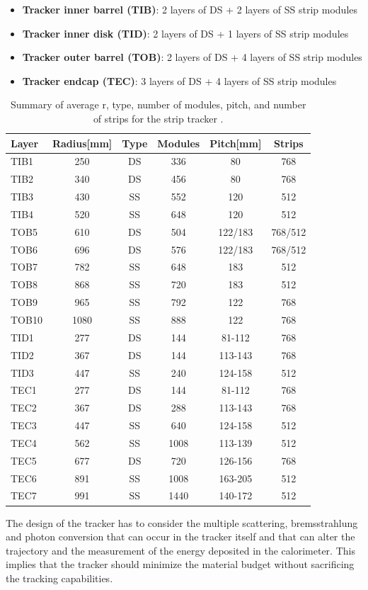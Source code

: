 \begin{itemize}

    \item \textbf{Tracker inner barrel (TIB)}: 2 layers of DS + 2 layers of SS strip modules 
    \item \textbf{Tracker inner disk (TID)}: 2 layers of DS + 1 layers of SS strip modules 
    \item \textbf{Tracker outer barrel (TOB)}: 2 layers of DS + 4 layers of SS strip modules 
    \item \textbf{Tracker endcap (TEC)}: 3 layers of DS + 4 layers of SS strip modules 
\end{itemize}
\begin{table}[h!]
    \centering
    \fontsize{11.5pt}{11.5pt}\selectfont
    \begin{tabular}{l|c|c|c|c|c}
        Layer&Radius[mm]&Type&Modules&Pitch[mm]&Strips\\
        \hline
        TIB1&250&DS&336&80&768\\
        TIB2& 340& DS& 456& 80& 768\\
        TIB3&430&SS&552&120&512\\
        TIB4&520&SS&648&120&512\\
        TOB5&610&DS&504&122/183&768/512\\
        TOB6&696&DS&576&122/183&768/512\\
        TOB7&782&SS&648&183&512\\
        TOB8&868&SS&720&183&512\\
        TOB9&965&SS&792&122&768\\
        TOB10&1080&SS&888&122&768\\
        TID1&277&DS&144&81-112&768\\
        TID2&367&DS&144&113-143&768\\
        TID3&447&SS&240&124-158&512\\
        TEC1&277&DS&144&81-112&768\\
        TEC2&367&DS&288&113-143&768\\
        TEC3&447&SS&640&124-158&512\\
        TEC4&562&SS&1008&113-139&512\\
        TEC5&677&DS&720&126-156&768\\
        TEC6&891&SS&1008&163-205&512\\
        TEC7&991&SS&1440&140-172&512\\
    \end{tabular}
    \caption{Summary of average r, type, number of modules, pitch, and number of strips for the strip tracker \cite{Friedl2001TheReadout}.}
    \label{tab:strip_tracker}
\end{table}
The design of the tracker has to consider the multiple scattering, bremsstrahlung and photon conversion that can occur in the tracker itself and that can alter the trajectory and the measurement of the energy deposited in the calorimeter. This implies that the tracker should minimize the material budget without sacrificing the tracking capabilities.


